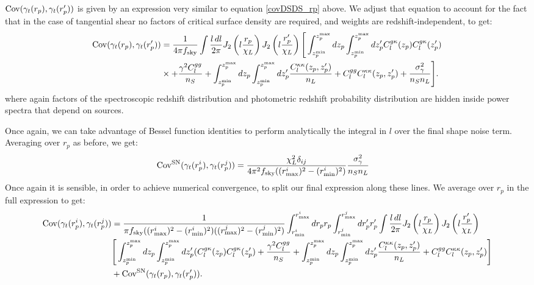 \documentclass[onecolumn,amsmath,aps,fleqn, superscriptaddress]{revtex4}
\begin{document}
${\rm Cov}(\gamma_t(r_p), \gamma_t(r_p^\prime))$ is given by an expression very similar to equation \ref{covDSDS_rp} above. We adjust that equation to account for the fact that in the case of tangential shear no factors of critical surface density are required, and weights are redshift-independent, to get:
\begin{align}
{\rm Cov}(\gamma_t(r_p), \gamma_t(r_p^\prime)) &= \frac{1}{4\pi f_{\rm sky}} \int \frac{l \, dl}{2\pi} J_2\left(l \frac{r_p}{\chi_L}\right) J_2 \left(l \frac{r_p^\prime}{\chi_L}\right) \Bigg[ \int_{z_p^{\rm min}}^{z_p^{\rm max}} d z_p  \int_{z_p^{\rm min}}^{z_p^{\rm max}} dz_p^\prime C_l^{g \kappa}(z_p)C_l^{g \kappa}(z_p^\prime)  \nonumber \\ &\times + \frac{ \gamma^2 C_l^{gg}}{n_S} + \int_{z_p^{\rm min}}^{z_p^{\rm max}} d z_p  \int_{z_p^{\rm min}}^{z_p^{\rm max}} dz_p^\prime\frac{C_l^{\kappa \kappa}(z_p, z_p^\prime)}{n_L} + C_l^{gg} C_l^{\kappa \kappa}(z_p, z_p^\prime) + \frac{\sigma_{\gamma}^2}{n_S n_L}\Bigg].
\label{covgtgt_rp}
\end{align}
where again factors of the spectroscopic redshift distribution and photometric redshift probability distribution are hidden inside power spectra that depend on sources.

Once again, we can take advantage of Bessel function identities to perform analytically the integral in $l$ over the final shape noise term. Averaging over $r_p$ as before, we get:
\begin{align}
{\rm Cov}^{\rm SN}(\gamma_t(r_p^i), \gamma_t(r_p^j)) &= \frac{\chi_L^2 \delta_{ij}}{4\pi^2 f_{\rm sky}((r^i_{\rm max})^2 - (r^i_{\rm min})^2)}\frac{\sigma_{\gamma}^2}{n_S n_L}
\label{SNgam}
\end{align}
Once again it is sensible, in order to achieve numerical convergence, to split our final expression along these lines. We average over $r_p$ in the full expression to get:
\begin{align}
{\rm Cov}(\gamma_t(r_p^i), \gamma_t(r_p^j)) &= \frac{1}{\pi f_{\rm sky}((r^i_{\rm max})^2 - (r^i_{\rm min})^2)((r^j_{\rm max})^2 - (r^j_{\rm min})^2)}  \int_{r^i_{\rm min}}^{r^i_{\rm max}} dr_p r_p \int_{r^j_{\rm min}}^{r^j_{\rm max}} dr_p^\prime r_p^\prime \int \frac{l \, dl}{2\pi} J_2\left(l \frac{r_p}{\chi_L}\right) J_2 \left(l \frac{r_p^\prime}{\chi_L}\right) \nonumber \\ &\Bigg[ \int_{z_p^{\rm min}}^{z_p^{\rm max}} d z_p  \int_{z_p^{\rm min}}^{z_p^{\rm max}} dz_p^\prime(C_l^{g \kappa}(z_p)C_l^{g \kappa}(z_p^\prime)   + \frac{ \gamma^2 C_l^{gg}}{n_S} + \int_{z_p^{\rm min}}^{z_p^{\rm max}} d z_p  \int_{z_p^{\rm min}}^{z_p^{\rm max}} dz_p^\prime\frac{C_l^{\kappa \kappa}(z_p, z_p^\prime)}{n_L} + C_l^{gg} C_l^{\kappa \kappa}(z_p, z_p^\prime)\Bigg] \nonumber \\ &+ {\rm Cov}^{\rm SN}(\gamma_t(r_p), \gamma_t(r_p^\prime)).
\label{covgtgt_rp_final}
\end{align}
\end{document}
